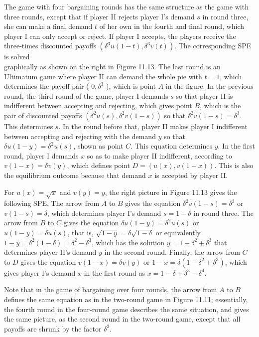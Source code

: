 \documentclass[12pt]{article}
\begin{document}
The game with four bargaining rounds has the same structure as the game with three rounds, except that if player II rejects player I's demand $s$ in round three, she can make a final demand $t$ of her own in the fourth and final round, which player I can only accept or reject. If player I accepts, the players receive the three-times discounted payoffs $\left(\delta^{3} u(1-t), \delta^{3} v(t)\right)$. The corresponding SPE is solved\\
graphically as shown on the right in Figure 11.13. The last round is an Ultimatum game where player II can demand the whole pie with $t=1$, which determines the payoff pair ( $0, \delta^{3}$ ), which is point $A$ in the figure. In the previous round, the third round of the game, player I demands $s$ so that player II is indifferent between accepting and rejecting, which gives point $B$, which is the pair of discounted payoffs $\left(\delta^{2} u(s), \delta^{2} v(1-s)\right)$ so that $\delta^{2} v(1-s)=\delta^{3}$. This determines $s$. In the round before that, player II makes player I indifferent between accepting and rejecting with the demand $y$ so that $\delta u(1-y)=\delta^{2} u(s)$, shown as point $C$. This equation determines $y$. In the first round, player I demands $x$ so as to make player II indifferent, according to $v(1-x)=\delta v(y)$, which defines point $D=(u(x), v(1-x))$. This is also the equilibrium outcome because that demand $x$ is accepted by player II.

For $u(x)=\sqrt{x}$ and $v(y)=y$, the right picture in Figure 11.13 gives the following SPE. The arrow from $A$ to $B$ gives the equation $\delta^{2} v(1-s)=\delta^{3}$ or $v(1-s)=\delta$, which determines player I's demand $s=1-\delta$ in round three. The arrow from $B$ to $C$ gives the equation $\delta u(1-y)=\delta^{2} u(s)$ or $u(1-y)=\delta u(s)$, that is, $\sqrt{1-y}=\delta \sqrt{1-\delta}$ or equivalently $1-y=\delta^{2}(1-\delta)=\delta^{2}-\delta^{3}$, which has the solution $y=1-\delta^{2}+\delta^{3}$ that determines player II's demand $y$ in the second round. Finally, the arrow from $C$ to $D$ gives the equation $v(1-x)=\delta v(y)$ or $1-x=\delta\left(1-\delta^{2}+\delta^{3}\right)$, which gives player I's demand $x$ in the first round as $x=1-\delta+\delta^{3}-\delta^{4}$.

Note that in the game of bargaining over four rounds, the arrow from $A$ to $B$ defines the same equation as in the two-round game in Figure 11.11; essentially, the fourth round in the four-round game describes the same situation, and gives the same picture, as the second round in the two-round game, except that all payoffs are shrunk by the factor $\delta^{2}$.
\end{document}
